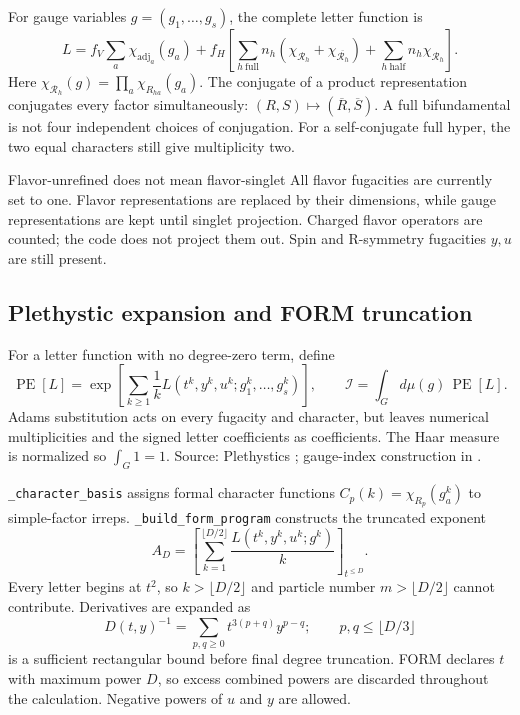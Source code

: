 \documentclass[11pt,a4paper]{article}
\numberwithin{equation}{section}
\newcommand{\code}[1]{{\small\nolinkurl{#1}}}
\newcommand{\PE}{\operatorname{PE}}
\newcommand{\adj}{\mathrm{adj}}
\newcommand{\src}[1]{{\small\color{muted}Source: #1.}\par}
\begin{document}
For gauge variables $g=(g_1,\ldots,g_s)$, the complete letter function is
\begin{equation}
 L=f_V\sum_a\chi_{\adj_a}(g_a)
 +f_H\left[\sum_{h\ \mathrm{full}}n_h
 (\chi_{\mathcal R_h}+\chi_{\overline{\mathcal R_h}})
 +\sum_{h\ \mathrm{half}}n_h\chi_{\mathcal R_h}\right].
 \label{eq:total-letter}
\end{equation}
Here $\chi_{\mathcal R_h}(g)=\prod_a\chi_{R_{ha}}(g_a)$.
The conjugate of a product representation conjugates every factor simultaneously:
$(R,S)\mapsto(\overline R,\overline S)$. A full bifundamental is not four
independent choices of conjugation. For a self-conjugate full hyper, the two
equal characters still give multiplicity two.

\begin{note}{Flavor-unrefined does not mean flavor-singlet}
All flavor fugacities are currently set to one. Flavor representations are
replaced by their dimensions, while gauge representations are kept until singlet
projection. Charged flavor operators are counted; the code does not project them
out. Spin and R-symmetry fugacities $y,u$ are still present.
\end{note}

\clearpage
\subsection{Plethystic expansion and FORM truncation}
For a letter function with no degree-zero term, define
\begin{equation}
 \PE[L]=\exp\!\left[\sum_{k\geq1}\frac1k
 L(t^k,y^k,u^k;g_1^k,\ldots,g_s^k)\right],\qquad
 \mathcal I=\int_G d\mu(g)\,\PE[L].
 \label{eq:full-pe}
\end{equation}
Adams substitution acts on every fugacity and character, but leaves numerical
multiplicities and the signed letter coefficients as coefficients. The Haar
measure is normalized so $\int_G1=1$.
\src{Plethystics \cite{plethystics}; gauge-index construction in \cite{gpr}}

\code{_character_basis} assigns formal character functions
$C_p(k)=\chi_{R_p}(g_a^k)$ to simple-factor irreps.
\code{_build_form_program} constructs the truncated exponent
\begin{equation}
 A_D=\left[\sum_{k=1}^{\lfloor D/2\rfloor}\frac{L(t^k,y^k,u^k;g^k)}k
 \right]_{t^{\leq D}}.
 \label{eq:trunc-exponent}
\end{equation}
Every letter begins at $t^2$, so $k>\lfloor D/2\rfloor$ and particle number
$m>\lfloor D/2\rfloor$ cannot contribute. Derivatives are expanded as
\begin{equation}
 D(t,y)^{-1}=\sum_{p,q\geq0}t^{3(p+q)}y^{p-q};
 \qquad p,q\leq\lfloor D/3\rfloor
 \label{eq:derivatives}
\end{equation}
is a sufficient rectangular bound before final degree truncation. FORM declares
$t$ with maximum power $D$, so excess combined powers are discarded throughout
the calculation. Negative powers of $u$ and $y$ are allowed.
\end{document}

